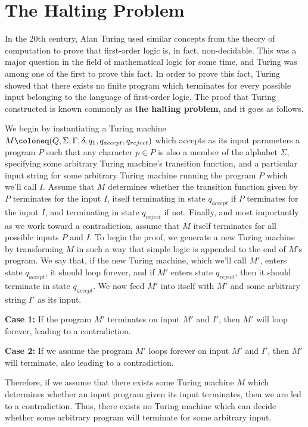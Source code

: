 \documentclass{article}
\begin{document}
\section{The Halting Problem}
In the 20th century, Alan Turing used similar concepts from the theory of computation to prove that first-order logic is, in fact, non-decidable.  This was a major question in the field of mathematical logic for some time, and Turing was among one of the first to prove this fact.  In order to prove this fact, Turing showed that there exists no finite program which terminates for every possible input belonging to the language of first-order logic.  The proof that Turing constructed is known commonly as \textbf{the halting problem}, and it goes as follows. \cite{7}
\begin{prf}
	We begin by instantiating a Turing machine $M \coloneq (Q, \Sigma, \Gamma, \delta, q_{1}, \newline q_{accept}, q_{reject})$ which accepts as its input parameters a program $P$ such that any character $p \in P$ is also a member of the alphabet $\Sigma$, specifying some arbitrary Turing machine's transition function, and a particular input string for some arbitrary Turing machine running the program $P$ which we'll call $I$.  Assume that $M$ determines whether the transition function given by $P$ terminates for the input $I$, itself terminating in state $q_{accept}$ if $P$ terminates for the input $I$, and terminating in state $q_{reject}$ if not.  Finally, and most importantly as we work toward a contradiction, assume that $M$ itself terminates for all possible inputs $P$ and $I$.  To begin the proof, we generate a new Turing machine by transforming $M$ in such a way that simple logic is appended to the end of $M$'s program.  We say that, if the new Turing machine, which we'll call $M'$, enters state $q_{accept}$, it should loop forever, and if $M'$ enters state $q_{reject}$, then it should terminate in state $q_{accept}$.  We now feed $M'$ into itself with $M'$ and some arbitrary string $I'$ as its input.\\
\begin{adjustwidth}{0.5cm}{}
	\textbf{Case 1:} If the program $M'$ terminates on input $M'$ and $I'$, then $M'$ will loop forever, leading to a contradiction.\\
\end{adjustwidth}
\begin{adjustwidth}{0.5cm}{}
	\textbf{Case 2:} If we assume the program $M'$ loops forever on input $M'$ and $I'$, then $M'$ will terminate, also leading to a contradiction.\\
\end{adjustwidth}
	\noindent Therefore, if we assume that there exists some Turing machine $M$ which determines whether an input program given its input terminates, then we are led to a contradiction.  Thus, there exists no Turing machine which can decide whether some arbitrary program will terminate for some arbitrary input. \cite{8} \qedsymbol
\end{prf}
\end{document}
